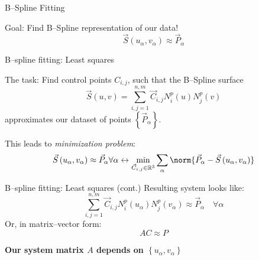 \begin{frame}{B--Spline Fitting}

\begin{block}{Goal:}
Find B--Spline representation of our data!\\
\begin{equation*}
\vec{S}\left(u_\alpha,v_\alpha\right) \approx \vec{P}_{\alpha} 
\end{equation*}
\end{block}

\end{frame}

\begin{frame}{B--spline fitting: Least squares}
\begin{block}{The task:}
Find control points $C_{i,j}$, such that the B--Spline surface
\begin{equation*}
\vec{S}\left(u,v\right)=\sum\limits_{i,j=1}^{n,m} \vec{C}_{i,j} N_i^p\left(u\right) N_j^p\left(v\right)
\end{equation*}
approximates our dataset of points $\left\lbrace \vec{P}_{\alpha} \right\rbrace $. 
\end{block}

This leads to \textit{minimization problem}:
\begin{equation*}
\vec{S}\left(u_\alpha,v_\alpha\right) \approx \vec{P}_{\alpha} \forall \alpha \leftrightarrow 
\underset{\vec{C}_{i,j}\in \mathbb{R}^3}{\min} \sum\limits_\alpha \norm{\vec{P}_{\alpha}-\vec{S}\left(u_\alpha,v_\alpha\right)}
\end{equation*}
\end{frame}

\begin{frame}{B--spline fitting: Least squares (cont.)}
Resulting system looks like:
\begin{equation*}
\sum\limits_{i,j=1}^{n,m} \vec{C}_{i,j} N_i^p\left(u_\alpha\right) N_j^p\left(v_\alpha\right) \approx \vec{P}_{\alpha} \quad \forall \alpha
\end{equation*}
Or, in matrix--vector form:
\begin{equation*}
A C \approx P
\end{equation*}

\begin{alertblock}{}
\begin{center}
\textbf{
Our system matrix $A$ depends on $\left\lbrace u_\alpha,v_\alpha \right\rbrace$}
\end{center}
\end{alertblock}

\end{frame}

